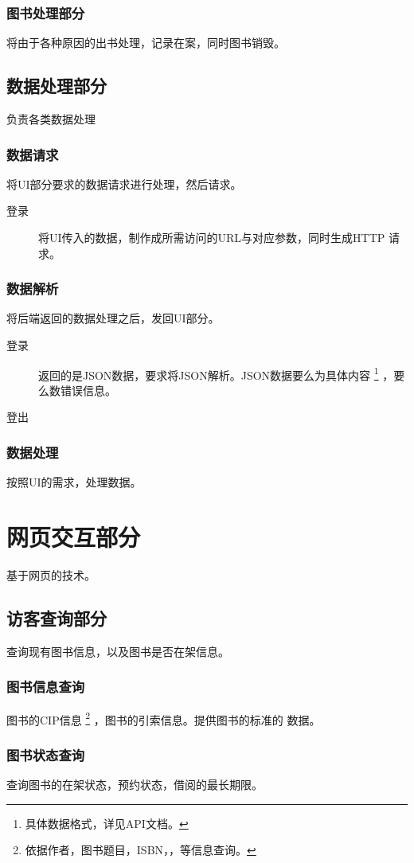 \documentclass[UTF8]{ctexrep}
\begin{document}
    \subsection{图书处理部分}
    将由于各种原因的出书处理，记录在案，同时图书销毁。
    \section{数据处理部分}
    负责各类数据处理
    \subsection{数据请求}
    将UI部分要求的数据请求进行处理，然后请求。
	\begin{description}
	\item[登录] 将UI传入的数据，制作成所需访问的URL与对应参数，同时生成HTTP
		请求。
	\end{description}
    \subsection{数据解析}
    将后端返回的数据处理之后，发回UI部分。
	\begin{description}
	\item[登录] 返回的是JSON数据，要求将JSON解析。JSON数据要么为具体内容
		\footnote{具体数据格式，详见API文档。}
		，要么数错误信息。
	\item[登出]
	\end{description}
    \subsection{数据处理}
    按照UI的需求，处理数据。
    \chapter{网页交互部分}
    基于网页的技术。
    \section{访客查询部分}
    查询现有图书信息，以及图书是否在架信息。
    \subsection{图书信息查询}
    图书的CIP信息
    \footnote{依据作者，图书题目，ISBN，，等信息查询。}
    ，图书的引索信息。提供图书的标准的 \BibTeX 数据。
    \subsection{图书状态查询}
    查询图书的在架状态，预约状态，借阅的最长期限。
\end{document}
